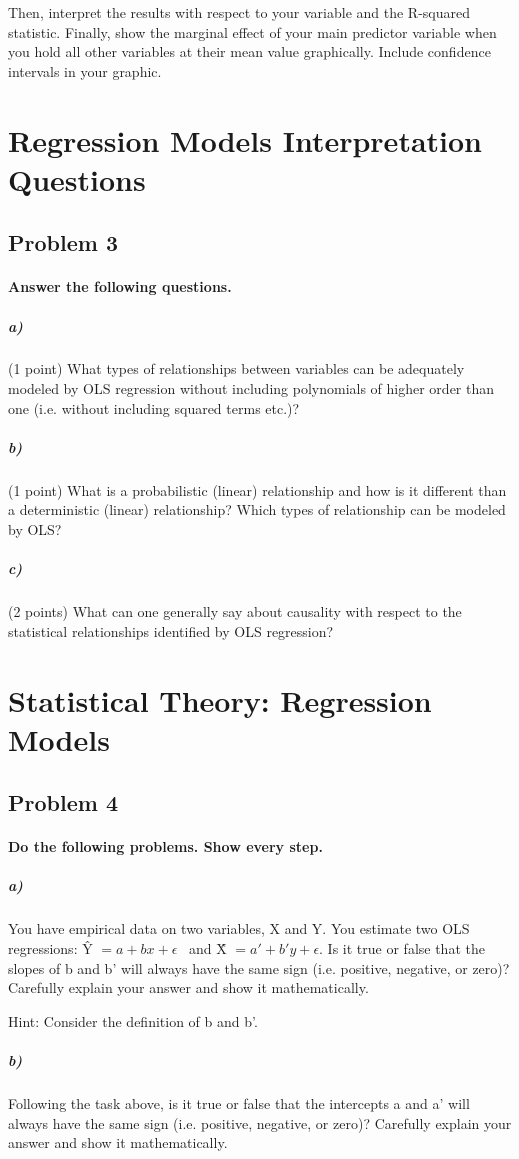 \documentclass[12pt,letter]{article}
\begin{document}
Then, interpret the results with respect to your variable and the R-squared statistic. Finally, show the marginal effect of your main predictor variable when you hold all other variables at their mean value graphically. Include confidence intervals in your graphic.



\pagebreak

\section*{Regression Models Interpretation Questions}

\subsection*{Problem 3}

\paragraph{Answer the following questions.}

\subparagraph{a)} (1 point) What types of relationships between variables can be adequately modeled by OLS regression without including polynomials of higher order than one (i.e. without including squared terms etc.)?

\subparagraph{b)} (1 point) What is a probabilistic (linear) relationship and how is it different than a deterministic (linear) relationship? Which types of relationship can be modeled by OLS?

\subparagraph{c)} (2 points) What can one generally say about causality with respect to the statistical relationships identified by OLS regression?



\section*{Statistical Theory: Regression Models}

\subsection*{Problem 4}

\paragraph{Do the following problems. Show every step.}

\subparagraph{a)} You have empirical data on two variables, X and Y. You estimate two OLS regressions: \^{Y} $= a + bx + \epsilon$ \ and \^{X} $= a' + b'y + \epsilon$. Is it true or false that the slopes of b and b' will always have the same sign (i.e. positive, negative, or zero)? Carefully explain your answer and show it mathematically.

Hint: Consider the definition of b and b'.

\subparagraph{b)} Following the task above, is it true or false that the intercepts a and a' will always have the same sign (i.e. positive, negative, or zero)? Carefully explain your answer and show it mathematically.
\end{document}
